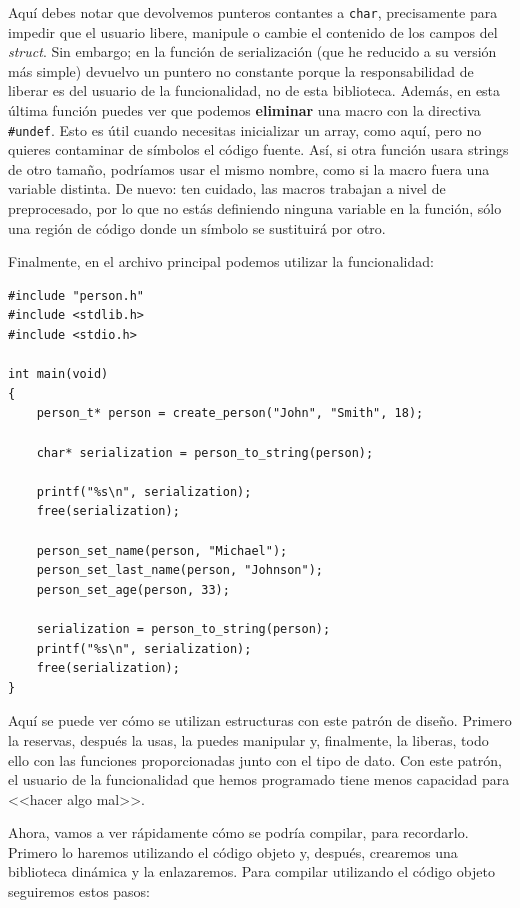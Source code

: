 \documentclass[a4paper]{article}
\begin{document}
Aquí debes notar que devolvemos punteros contantes a \verb!char!, precisamente
para impedir que el usuario libere, manipule o cambie el contenido de los campos
del \textit{struct}. Sin embargo; en la función de serialización (que he
reducido a su versión más simple) devuelvo un puntero no constante porque la
responsabilidad de liberar es del usuario de la funcionalidad, no de esta
biblioteca. Además, en esta última función puedes ver que podemos
\textbf{eliminar} una macro con la directiva \verb!#undef!. Esto es útil cuando
necesitas inicializar un array, como aquí, pero no quieres contaminar de
símbolos el código fuente. Así, si otra función usara strings de otro tamaño,
podríamos usar el mismo nombre, como si la macro fuera una variable distinta.
De nuevo: ten cuidado, las macros trabajan a nivel de preprocesado, por lo que
no estás definiendo ninguna variable en la función, sólo una región de código
donde un símbolo se sustituirá por otro.

Finalmente, en el archivo principal podemos utilizar la funcionalidad:

\noindent
\begin{minipage}[H]{\linewidth}
\mbox{}
\begin{lstlisting}[style=C, label={lst:finalExMain},
caption={Ejemplo final de programa -- \texttt{main.c}}]
#include "person.h"
#include <stdlib.h>
#include <stdio.h>

int main(void)
{
    person_t* person = create_person("John", "Smith", 18);

    char* serialization = person_to_string(person);

    printf("%s\n", serialization);
    free(serialization);

    person_set_name(person, "Michael");
    person_set_last_name(person, "Johnson");
    person_set_age(person, 33);

    serialization = person_to_string(person);
    printf("%s\n", serialization);
    free(serialization);
}
\end{lstlisting}
\end{minipage}

Aquí se puede ver cómo se utilizan estructuras con este patrón de diseño.
Primero la reservas, después la usas, la puedes manipular y, finalmente, la
liberas, todo ello con las funciones proporcionadas junto con el tipo de dato.
Con este patrón, el usuario de la funcionalidad que hemos programado tiene
menos capacidad para <<hacer algo mal>>.

Ahora, vamos a ver rápidamente cómo se podría compilar, para recordarlo. Primero
lo haremos utilizando el código objeto y, después, crearemos una biblioteca
dinámica y la enlazaremos. Para compilar utilizando el código
objeto seguiremos estos pasos:
\end{document}
